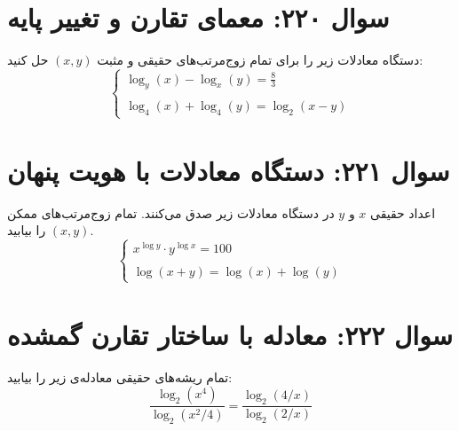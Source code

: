 \documentclass[12pt]{article}
\begin{document}
\section*{سوال ۲۲۰: معمای تقارن و تغییر پایه}
دستگاه معادلات زیر را برای تمام زوج‌مرتب‌های حقیقی و مثبت \((x, y)\) حل کنید:
\begin{displaymath}
	\begin{cases}
		\log_y(x) - \log_x(y) = \frac{8}{3} \\
		\\
		\log_4(x) + \log_4(y) = \log_2(x-y)
	\end{cases}
\end{displaymath}

\section*{سوال ۲۲۱: دستگاه معادلات با هویت پنهان}
اعداد حقیقی \(x\) و \(y\) در دستگاه معادلات زیر صدق می‌کنند. تمام زوج‌مرتب‌های ممکن \((x, y)\) را بیابید.
\begin{displaymath}
	\begin{cases}
		x^{\log y} \cdot y^{\log x} = 100 \\
		\\
		\log(x+y) = \log(x) + \log(y)
	\end{cases}
\end{displaymath}

\section*{سوال ۲۲۲: معادله با ساختار تقارن گمشده}
تمام ریشه‌های حقیقی معادله‌ی زیر را بیابید:
\begin{displaymath}
	\frac{\log_2(x^4)}{\log_2(x^2/4)} = \frac{\log_2(4/x)}{\log_2(2/x)}
\end{displaymath}

\vspace{1cm}
\hrulefill
\vspace{1cm}
\end{document}
